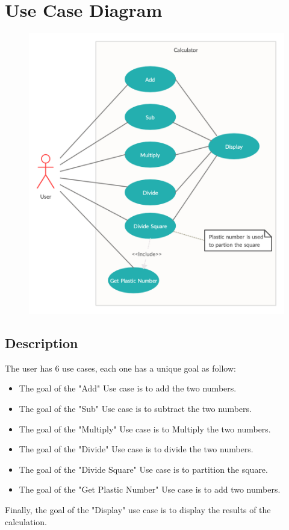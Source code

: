 \documentclass{report}
\begin{document}

\newpage
\newpage
\chapter{Use Case Diagram}
\begin{figure}[h!]
\centering
\includegraphics[scale=0.4]{UseCase.png}
\label{fig:UseCase}
\end{figure}
\section{Description}
The user has 6 use cases, each one has a unique goal as follow:
\begin{itemize}
    \item The goal of the "Add" Use case is to add the two numbers. 
    \item The goal of the "Sub" Use case is to subtract the two numbers. 
    \item The goal of the "Multiply" Use case is to Multiply the two numbers. 
    \item The goal of the "Divide" Use case is to divide the two numbers. 
    \item The goal of the "Divide Square" Use case is to partition the square.
    \item The goal of the "Get Plastic Number" Use case is to add two numbers. 
\end{itemize}
Finally, the goal of the "Display" use case is to display the results of the calculation.



\end{document}
